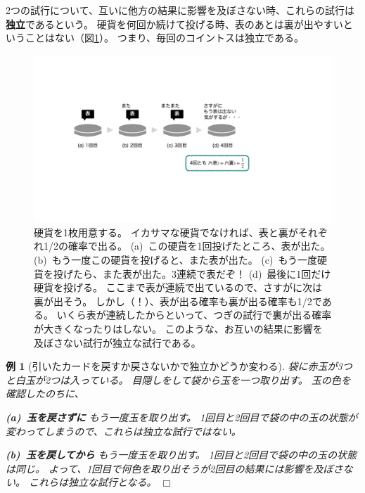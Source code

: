 \documentclass[12pt]{ltjsarticle}\usepackage{ifthen}\newcounter{enlarge}\setcounter{enlarge}{1}
\def\qed{\hfill $\Box$}
\newtheorem{eg}{例}
\begin{document}
2つの試行について、互いに他方の結果に影響を及ぼさない時、これらの試行は\textbf{独立}であるという。
硬貨を何回か続けて投げる時、表のあとは裏が出やすいということはない（図\ref{f:2.2.1}）。
つまり、毎回のコイントスは独立である。

\begin{figure}[] 
  \centering 
  \includegraphics[width=12truecm]{./figure/f2-2-1.pdf}
  \captionsetup{width=.9\linewidth}
  \caption{%
    硬貨を1枚用意する。
    イカサマな硬貨でなければ、表と裏がそれぞれ1/2の確率で出る。
    (a)~この硬貨を1回投げたところ、表が出た。
    (b)~もう一度この硬貨を投げると、また表が出た。
    (c)~もう一度硬貨を投げたら、また表が出た。3連続で表だぞ！
    (d)~最後に1回だけ硬貨を投げる。
    ここまで表が連続で出ているので、さすがに次は裏が出そう。
    しかし（！）、表が出る確率も裏が出る確率も1/2である。
    いくら表が連続したからといって、つぎの試行で裏が出る確率が大きくなったりはしない。
    このような、お互いの結果に影響を及ぼさない試行が独立な試行である。
  }
  \label{f:2.2.1}
\end{figure}

\begin{eg}[引いたカードを戻すか戻さないかで独立かどうか変わる]
  袋に赤玉が3つと白玉が2つは入っている。
  目隠しをして袋から玉を一つ取り出す。
  玉の色を確認したのちに、

  \textbf{(a)~玉を戻さずに}
  もう一度玉を取り出す。
  1回目と2回目で袋の中の玉の状態が変わってしまうので、これらは独立な試行ではない。

  \textbf{(b)~玉を戻してから}
  もう一度玉を取り出す。
  1回目と2回目で袋の中の玉の状態は同じ。
  よって、1回目で何色を取り出そうが2回目の結果には影響を及ぼさない。
  これらは独立な試行となる。
\qed\end{eg}
\end{document}
